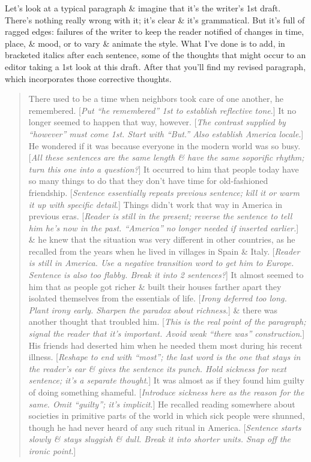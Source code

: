 \documentclass{article}
\begin{document}
Let's look at a typical paragraph \& imagine that it's the writer's 1st draft. There's nothing really wrong with it; it's clear \& it's grammatical. But it's full of ragged edges: failures of the writer to keep the reader notified of changes in time, place, \& mood, or to vary \& animate the style. What I've done is to add, in bracketed italics after each sentence, some of the thoughts that might occur to an editor taking a 1st look at this draft. After that you'll find my revised paragraph, which incorporates those corrective thoughts.
\begin{quotation}
	There used to be a time when neighbors took care of one another, he remembered. [\textit{Put ``he remembered'' 1st to establish reflective tone}.] It no longer seemed to happen that way, however. [\textit{The contrast supplied by ``however'' must come 1st. Start with ``But.'' Also establish America locale}.] He wondered if it was because everyone in the modern world was so busy. [\textit{All these sentences are the same length \& have the same soporific rhythm; turn this one into a question?}] It occurred to him that people today have so many things to do that they don't have time for old-fashioned friendship. [\textit{Sentence essentially repeats previous sentence; kill it or warm it up with specific detail}.] Things didn't work that way in America in previous eras. [\textit{Reader is still in the present; reverse the sentence to tell him he's now in the past. ``America'' no longer needed if inserted earlier.}] \& he knew that the situation was very different in other countries, as he recalled from the years when he lived in villages in Spain \& Italy. [\textit{Reader is still in America. Use a negative transition word to get him to Europe. Sentence is also too flabby. Break it into 2 sentences?}] It almost seemed to him that as people got richer \& built their houses farther apart they isolated themselves from the essentials of life. [\textit{Irony deferred too long. Plant irony early. Sharpen the paradox about richness}.] \& there was another thought that troubled him. [\textit{This is the real point of the paragraph; signal the reader that it's important. Avoid weak ``there was'' construction}.] His friends had deserted him when he needed them most during his recent illness. [\textit{Reshape to end with ``most''; the last word is the one that stays in the reader's ear \& gives the sentence its punch. Hold sickness for next sentence; it's a separate thought}.] It was almost as if they found him guilty of doing something shameful. [\textit{Introduce sickness here as the reason for the same. Omit ``guilty''; it's implicit}.] He recalled reading somewhere about societies in primitive parts of the world in which sick people were shunned, though he had never heard of any such ritual in America. [\textit{Sentence starts slowly \& stays sluggish \& dull. Break it into shorter units. Snap off the ironic point}.]
	

\end{quotation}
\end{document}
